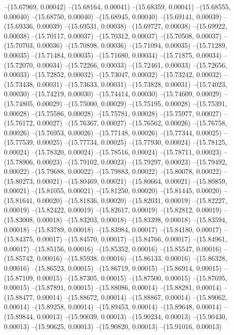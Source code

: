 --(15.67969, 0.00042)
--(15.68164, 0.00041)
--(15.68359, 0.00041)
--(15.68555, 0.00040)
--(15.68750, 0.00040)
--(15.68945, 0.00040)
--(15.69141, 0.00039)
--(15.69336, 0.00039)
--(15.69531, 0.00038)
--(15.69727, 0.00038)
--(15.69922, 0.00038)
--(15.70117, 0.00037)
--(15.70312, 0.00037)
--(15.70508, 0.00037)
--(15.70703, 0.00036)
--(15.70898, 0.00036)
--(15.71094, 0.00035)
--(15.71289, 0.00035)
--(15.71484, 0.00035)
--(15.71680, 0.00034)
--(15.71875, 0.00034)
--(15.72070, 0.00034)
--(15.72266, 0.00033)
--(15.72461, 0.00033)
--(15.72656, 0.00033)
--(15.72852, 0.00032)
--(15.73047, 0.00032)
--(15.73242, 0.00032)
--(15.73438, 0.00031)
--(15.73633, 0.00031)
--(15.73828, 0.00031)
--(15.74023, 0.00030)
--(15.74219, 0.00030)
--(15.74414, 0.00030)
--(15.74609, 0.00029)
--(15.74805, 0.00029)
--(15.75000, 0.00029)
--(15.75195, 0.00028)
--(15.75391, 0.00028)
--(15.75586, 0.00028)
--(15.75781, 0.00028)
--(15.75977, 0.00027)
--(15.76172, 0.00027)
--(15.76367, 0.00027)
--(15.76562, 0.00026)
--(15.76758, 0.00026)
--(15.76953, 0.00026)
--(15.77148, 0.00026)
--(15.77344, 0.00025)
--(15.77539, 0.00025)
--(15.77734, 0.00025)
--(15.77930, 0.00024)
--(15.78125, 0.00024)
--(15.78320, 0.00024)
--(15.78516, 0.00024)
--(15.78711, 0.00023)
--(15.78906, 0.00023)
--(15.79102, 0.00023)
--(15.79297, 0.00023)
--(15.79492, 0.00022)
--(15.79688, 0.00022)
--(15.79883, 0.00022)
--(15.80078, 0.00022)
--(15.80273, 0.00021)
--(15.80469, 0.00021)
--(15.80664, 0.00021)
--(15.80859, 0.00021)
--(15.81055, 0.00021)
--(15.81250, 0.00020)
--(15.81445, 0.00020)
--(15.81641, 0.00020)
--(15.81836, 0.00020)
--(15.82031, 0.00019)
--(15.82227, 0.00019)
--(15.82422, 0.00019)
--(15.82617, 0.00019)
--(15.82812, 0.00019)
--(15.83008, 0.00018)
--(15.83203, 0.00018)
--(15.83398, 0.00018)
--(15.83594, 0.00018)
--(15.83789, 0.00018)
--(15.83984, 0.00017)
--(15.84180, 0.00017)
--(15.84375, 0.00017)
--(15.84570, 0.00017)
--(15.84766, 0.00017)
--(15.84961, 0.00017)
--(15.85156, 0.00016)
--(15.85352, 0.00016)
--(15.85547, 0.00016)
--(15.85742, 0.00016)
--(15.85938, 0.00016)
--(15.86133, 0.00016)
--(15.86328, 0.00016)
--(15.86523, 0.00015)
--(15.86719, 0.00015)
--(15.86914, 0.00015)
--(15.87109, 0.00015)
--(15.87305, 0.00015)
--(15.87500, 0.00015)
--(15.87695, 0.00015)
--(15.87891, 0.00015)
--(15.88086, 0.00014)
--(15.88281, 0.00014)
--(15.88477, 0.00014)
--(15.88672, 0.00014)
--(15.88867, 0.00014)
--(15.89062, 0.00014)
--(15.89258, 0.00014)
--(15.89453, 0.00014)
--(15.89648, 0.00014)
--(15.89844, 0.00013)
--(15.90039, 0.00013)
--(15.90234, 0.00013)
--(15.90430, 0.00013)
--(15.90625, 0.00013)
--(15.90820, 0.00013)
--(15.91016, 0.00013)
